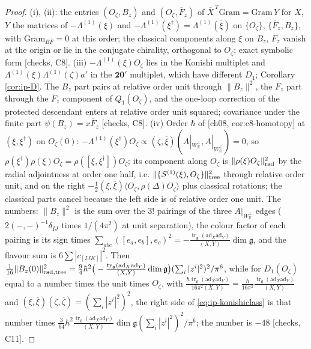 \documentclass[11pt]{report}
\theoremstyle{plain}
\theoremstyle{definition}
\numberwithin{equation}{chapter}
\newcommand{\unit}{\tfrac{\hbar\operatorname{tr}_{\mathfrak g}(\mathrm{ad}_X\mathrm{ad}_Y)}{16\pi^2(X,Y)}}
\newcommand{\lam}{\tfrac{\operatorname{tr}_{\mathfrak g}(\mathrm{ad}_X\mathrm{ad}_Y)}{(X,Y)}}
\newcommand{\Wp}{W_{\mathbb R}^\perp}
\newcommand{\rad}{{\rm rad}}
\newcommand{\Ko}{(A|_{\Wp},A|_{\Wp})}
\begin{document}
\begin{proof}
(i), (ii): the entries $(O_\zeta,B_z)$ and $(O_\zeta,\overline F_z)$ of $\overline X^{\,T}\mathrm{Gram}=\mathrm{Gram}\,Y$ for $X$, $Y$ the matrices of $-\Lambda^{(1)}(\xi)$ and $-\Lambda^{(1)}(\xi^\dagger)=\Lambda^{(1)}(\overline\xi)$ on $\{O_\zeta\}$, $\{\overline F_z,B_z\}$, with $\mathrm{Gram}_{B\overline F}=0$ at this order; the classical components along $\overline\xi$ on $B_z$, $\overline F_z$ vanish at the origin or lie in the conjugate chirality, orthogonal to $O_\zeta$; exact symbolic form [checks, C8]. (iii) $-\Lambda^{(1)}(\xi)O_\zeta$ lies in the Konishi multiplet and $\Lambda^{(1)}(\xi)\Lambda^{(1)}(\zeta)a'$ in the $\mathbf{20'}$ multiplet, which have different $D_1$; Corollary \ref{cor:ip-D}. The $B_z$ part pairs at relative order unit through $\|B_z\|^2$, the $\overline F_z$ part through the $\overline F_z$ component of $Q_1(O_\zeta)$, and the one-loop correction of the protected descendant enters at relative order unit squared; covariance under the finite part $\psi(B_z)=x\overline F_z$ [checks, C8]. (iv) Order $\hbar$ of [ch08, cor:c8-homotopy] at $(\xi,\xi^\dagger)$ on $O_\zeta(0)$: $-\Lambda^{(1)}(\xi^\dagger)O_\zeta\propto(\zeta,\overline\xi)\Ko=0$, so $\rho(\xi^\dagger)\rho(\xi)O_\zeta=\rho([\xi,\xi^\dagger])O_\zeta$; its component along $O_\zeta$ is $\|\rho(\xi)O_\zeta\|^2_\rad$ by the radial adjointness at order one half, i.e. $\|\{S^{(1)}(\xi),O_\zeta\}\|^2_{\rm tree}$ through relative order unit, and on the right $-\tfrac12(\xi,\overline\xi)\langle O_\zeta,\rho(\Delta)O_\zeta\rangle$ plus classical rotations; the classical parts cancel because the left side is of relative order one unit. The numbers: $\|B_z\|^2$ is the sum over the $3!$ pairings of the three $A|_{\Wp}$ edges ($2(-,-)^{-1}\delta_{IJ}$ times $1/(4\pi^2)$ at unit separation), the colour factor of each pairing is its sign times $\sum_{abc}([e_a,e_b],e_c)^2=-\lam\dim\mathfrak g$, and the flavour sum is $6\sum|c_{[IJK]}|^2$. Then $\tfrac1{16}\|B_z(0)\|^2_{\rad,{\rm tree}}=\tfrac94\hbar^2\big(-\lam\dim\mathfrak g\big)(\sum_i|z^i|^2)^2/\pi^6$, while for $D_1(O_\zeta)$ equal to a number times the unit times $O_\zeta$, with $\unit=\frac{\hbar}{16\pi^2}\lam$ and $(\xi,\overline\xi)(\zeta,\overline\zeta)=(\sum_i|z^i|^2)^2$, the right side of \eqref{eq:ip-konishiclass} is that number times $\tfrac3{64}\hbar^2\lam\dim\mathfrak g(\sum_i|z^i|^2)^2/\pi^6$; the number is $-48$ [checks, C11].
\end{proof}
\end{document}
